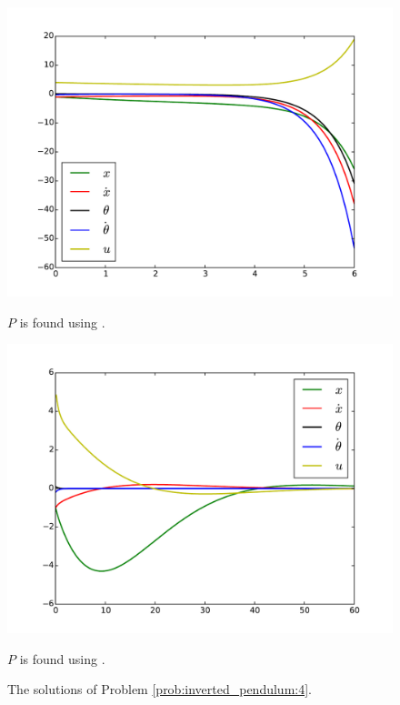 \begin{figure}
\begin{minipage}[b]{.47\linewidth}
\centering
\includegraphics[width=\textwidth]{prob4_unstable.pdf}
\caption*{$P$ is found using .}
\end{minipage}
\hspace{0.5cm}
\begin{minipage}[b]{0.47\linewidth}
\centering
\includegraphics[width=\textwidth]{prob4_stable.pdf}
\caption*{$P$ is found using .}
\end{minipage}
\caption{The solutions of Problem \ref{prob:inverted_pendulum:4}.}
\label{fig:inverted_pendulum:4}
\end{figure}
